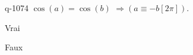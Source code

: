 \begin{truefalse}{q-1074}
$\cos(a)=\cos(b)$  $\Rightarrow \left(a\equiv -b [2\pi]\right)$.
\item Vrai
\item* Faux
\end{truefalse}

